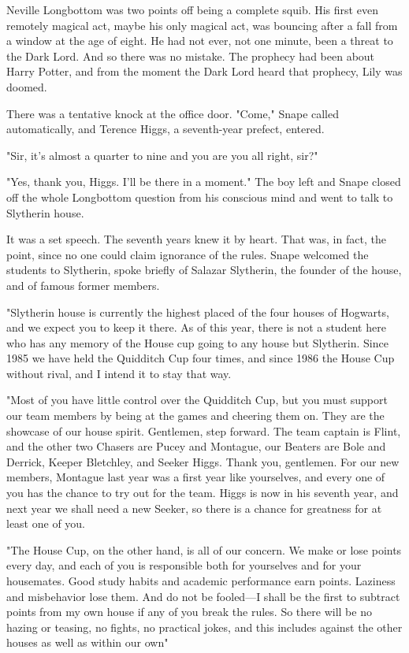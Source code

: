 Neville Longbottom was two points off being a complete squib. His first even remotely magical act, maybe his only magical act, was bouncing after a fall from a window at the age of eight. He had not ever, not one minute, been a threat to the Dark Lord. And so there was no mistake. The prophecy had been about Harry Potter, and from the moment the Dark Lord heard that prophecy, Lily was doomed.

There was a tentative knock at the office door. "Come," Snape called automatically, and Terence Higgs, a seventh-year prefect, entered.

"Sir, it's almost a quarter to nine and you{\el} are you all right, sir?"

"Yes, thank you, Higgs. I'll be there in a moment." The boy left and Snape closed off the whole Longbottom question from his conscious mind and went to talk to Slytherin house.

It was a set speech. The seventh years knew it by heart. That was, in fact, the point, since no one could claim ignorance of the rules. Snape welcomed the students to Slytherin, spoke briefly of Salazar Slytherin, the founder of the house, and of famous former members.

"Slytherin house is currently the highest placed of the four houses of Hogwarts, and we expect you to keep it there. As of this year, there is not a student here who has any memory of the House cup going to any house but Slytherin. Since 1985 we have held the Quidditch Cup four times, and since 1986 the House Cup without rival, and I intend it to stay that way.

"Most of you have little control over the Quidditch Cup, but you must support our team members by being at the games and cheering them on. They are the showcase of our house spirit. Gentlemen, step forward. The team captain is Flint, and the other two Chasers are Pucey and Montague, our Beaters are Bole and Derrick, Keeper Bletchley, and Seeker Higgs. Thank you, gentlemen. For our new members, Montague last year was a first year like yourselves, and every one of you has the chance to try out for the team. Higgs is now in his seventh year, and next year we shall need a new Seeker, so there is a chance for greatness for at least one of you.

"The House Cup, on the other hand, is all of our concern. We make or lose points every day, and each of you is responsible both for yourselves and for your housemates. Good study habits and academic performance earn points. Laziness and misbehavior lose them. And do not be fooled—I shall be the first to subtract points from my own house if any of you break the rules. So there will be no hazing or teasing, no fights, no practical jokes, and this includes against the other houses as well as within our own{\el}"

